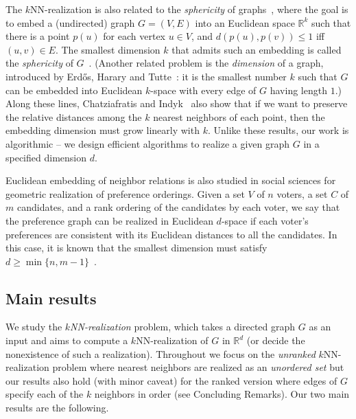 The $k$NN-realization is also related to the \emph{sphericity} of graphs~\cite{maehara:1984}, where the goal is to embed a (undirected) graph $G=(V,E)$ into an Euclidean space $\mathbb{R}^k$ such that there is a point $p(u)$ for each vertex $u \in V$, and $d(p(u), p(v)) \leq 1$ iff $(u, v) \in E$.  The smallest dimension $k$ that admits such an embedding is called the \emph{sphericity} of $G$~\cite{maehara:1984}. (Another related problem is the \emph{dimension} of a graph, introduced by Erd\H{o}s, Harary and Tutte~\cite{erdos:65}: it is the smallest number $k$ such that $G$ can be embedded into Euclidean $k$-space with every edge of $G$ having length $1$.) Along these lines, Chatziafratis and Indyk~\cite{chatziafratis2024} also show that if we want to preserve the relative distances among the $k$ nearest neighbors of each point, then the embedding dimension must grow linearly with $k$. Unlike these results, our work is algorithmic -- we design efficient algorithms to realize a given graph $G$ in a specified dimension $d$.

Euclidean embedding of neighbor relations is also studied in social sciences for geometric realization of preference orderings. Given a set $V$ of $n$ voters, a set $C$ of $m$ candidates, and a rank ordering of the candidates by each voter, we say that the preference graph can be realized in Euclidean $d$-space if each voter's preferences are consistent with its Euclidean distances to all the candidates. In this case, it is known that the smallest dimension must satisfy $d \geq \min \{n , m-1\}$~\cite{bogomolnaia:2007}.

\subsection{Main results}

We study the \textit{$k$NN-realization} problem, which takes a directed graph $G$ as an input and aims to compute a $k$NN-realization of $G$ in $\mathbb{R}^d$ (or decide the nonexistence of such a realization).
Throughout we focus on the \emph{unranked} $k$NN-realization problem where nearest neighbors are realized as an \emph{unordered set} but our results also hold (with minor caveat) for the ranked version where edges of $G$ specify each of the $k$ neighbors in order (see Concluding Remarks). 
Our two main results are the following.

